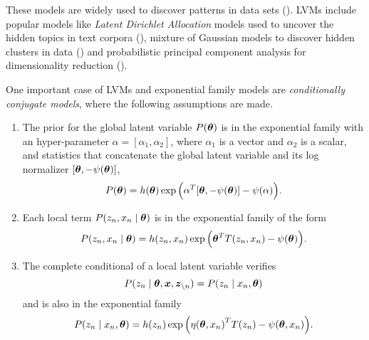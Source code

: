 \begin{remark}
  These models are widely used to discover patterns in data sets (\cite{blei2014build}).
  LVMs include popular models like \emph{Latent Dirichlet Allocation} models used to uncover the hidden topics in text corpora (\cite{blei2003latent}), mixture of Gaussian models to discover hidden clusters in data (\cite{bishop2006pattern}) and probabilistic principal component analysis for dimensionality reduction (\cite{tipping1999probabilistic}).
\end{remark}

One important case of LVMs and exponential family models are \emph{conditionally conjugate models}, where the following assumptions are made.
\begin{enumerate}[itemsep=2ex]
  \item The prior for the global latent variable \(P(\bm{\theta})\) is in the exponential family with an hyper-parameter \(\alpha = [\alpha_{1}, \alpha_{2}]\), where \(\alpha_{1}\) is a vector and \(\alpha_{2}\) is a scalar, and statistics that concatenate the global latent variable and its log normalizer \([\bm{\theta}, -\psi(\bm{\theta})]\),
    \[
    P(\bm{\theta}) = h(\bm{\theta}) \exp \Big( \alpha^{T}[\bm{\theta}, -\psi(\bm{\theta})] - \psi(\alpha)\Big).
    \]
  \item Each local term \(P(z_{n},x_{n} \mid \bm{\theta})\) is in the exponential family of the form
    \[
    P(z_{n},x_{n} \mid \bm{\theta}) = h(z_{n}, x_{n}) \exp \Big( \bm{\theta}^{T} T(z_{n}, x_{n}) - \psi(\bm{\theta}) \Big).
    \]
  \item The complete conditional of a local latent variable verifies
    \[
    P(z_{n} \mid \bm{\theta}, \bm{x}, \bm{z}_{\backslash n}) = P(z_{n} \mid x_{n}, \bm{\theta})
    \]
    and is also in the exponential family
    \[
    P(z_{n}\mid x_{n} , \bm{\theta}) =  h(z_{n})\exp \Big( {\eta(\bm{\theta}, x_{n})}^{T}T(z_{n}) - \psi(\bm{\theta}, x_{n}) \Big).
    \]

\end{enumerate}

